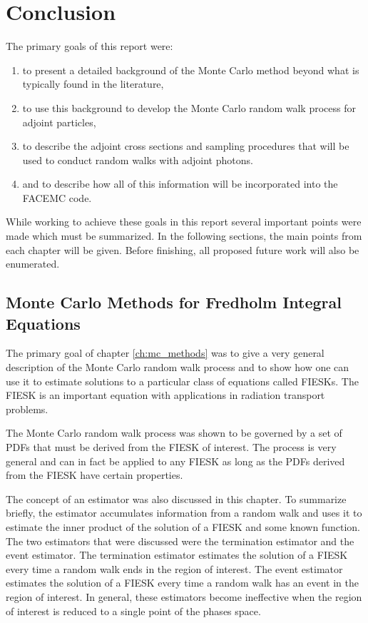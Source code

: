 \chapter{Conclusion}
The primary goals of this report were:
\begin{enumerate}
  \item to present a detailed background of the Monte Carlo method beyond what 
    is typically found in the literature,
  \item to use this background to develop the Monte Carlo random walk process
    for adjoint particles,
  \item to describe the adjoint cross sections and sampling procedures that 
    will be used to conduct random walks with adjoint photons.
  \item and to describe how all of this information will be incorporated into
    the FACEMC code. 
\end{enumerate}

While working to achieve these goals in this report several important points 
were made which must be summarized. In the following sections, the main points 
from each chapter will be given. Before finishing, all proposed future work will
also be enumerated. 

\section{Monte Carlo Methods for Fredholm Integral Equations}
The primary goal of chapter \ref{ch:mc_methods} was to give a very general
description of the Monte Carlo random walk process and to show how one can use
it to estimate solutions to a particular class of equations called FIESKs. 
The FIESK is an important equation with applications in radiation transport
problems. 

The Monte Carlo random walk process was shown to be governed by a set of PDFs 
that must be derived from the FIESK of interest. The process is very general 
and can in fact be applied to any FIESK as long as the PDFs derived from the 
FIESK have certain properties. 

The concept of an estimator was also discussed in this chapter. To summarize 
briefly, the estimator accumulates information from a random walk and uses
it to estimate the inner product of the solution of a FIESK and some known
function. The two estimators that were discussed were the termination estimator 
and the event estimator. The termination estimator estimates the solution of a
FIESK every time a random walk ends in the region of interest. The event
estimator estimates the solution of a FIESK every time a random walk has an
event in the region of interest. In general, these estimators become ineffective
when the region of interest is reduced to a single point of the phases space.

